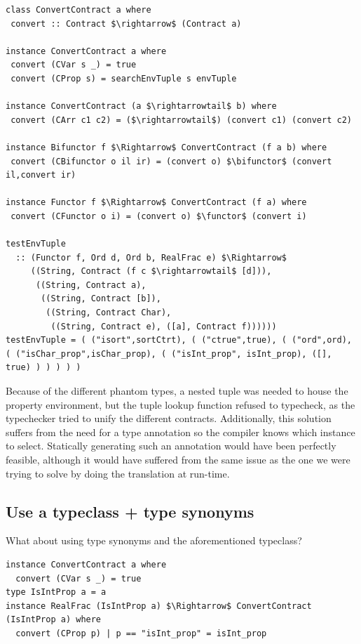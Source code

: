 \documentclass[10pt]{report}
\makeatletter
\newcommand{\functor}{<\!\!\!@\!\!\!>}
\newcommand{\bifunctor}{<\!\!\!@\!\!@\!\!\!>}
\makeatother
\begin{document}
{\begin{lstlisting}[caption=Attempt at using a typeclass to recover the extra type information.,mathescape]
class ConvertContract a where
 convert :: Contract $\rightarrow$ (Contract a)

instance ConvertContract a where
 convert (CVar s _) = true
 convert (CProp s) = searchEnvTuple s envTuple

instance ConvertContract (a $\rightarrowtail$ b) where
 convert (CArr c1 c2) = ($\rightarrowtail$) (convert c1) (convert c2)

instance Bifunctor f $\Rightarrow$ ConvertContract (f a b) where
 convert (CBifunctor o il ir) = (convert o) $\bifunctor$ (convert il,convert ir)

instance Functor f $\Rightarrow$ ConvertContract (f a) where
 convert (CFunctor o i) = (convert o) $\functor$ (convert i)
 
testEnvTuple
  :: (Functor f, Ord d, Ord b, RealFrac e) $\Rightarrow$
     ((String, Contract (f c $\rightarrowtail$ [d])),
      ((String, Contract a),
       ((String, Contract [b]),
        ((String, Contract Char),
         ((String, Contract e), ([a], Contract f))))))
testEnvTuple = ( ("isort",sortCtrt), ( ("ctrue",true), ( ("ord",ord), ( ("isChar_prop",isChar_prop), ( ("isInt_prop", isInt_prop), ([], true) ) ) ) ) )
\end{lstlisting}

Because of the different phantom types, a nested tuple was needed to house the property environment, but the tuple lookup function refused to typecheck, as the typechecker tried to unify the different contracts.
Additionally, this solution suffers from the need for a type annotation so the compiler knows which instance to select.
Statically generating such an annotation would have been perfectly feasible, although it would have suffered from the same issue as the one we were trying to solve by doing the translation at run-time.

\subsection{Use a typeclass + type synonyms}
What about using type synonyms and the aforementioned typeclass?

\begin{lstlisting}[caption=Attempt at using type synonyms to choose the correct instances.,mathescape]
instance ConvertContract a where
  convert (CVar s _) = true
type IsIntProp a = a
instance RealFrac (IsIntProp a) $\Rightarrow$ ConvertContract (IsIntProp a) where
  convert (CProp p) | p == "isInt_prop" = isInt_prop
\end{lstlisting}

}
\end{document}
